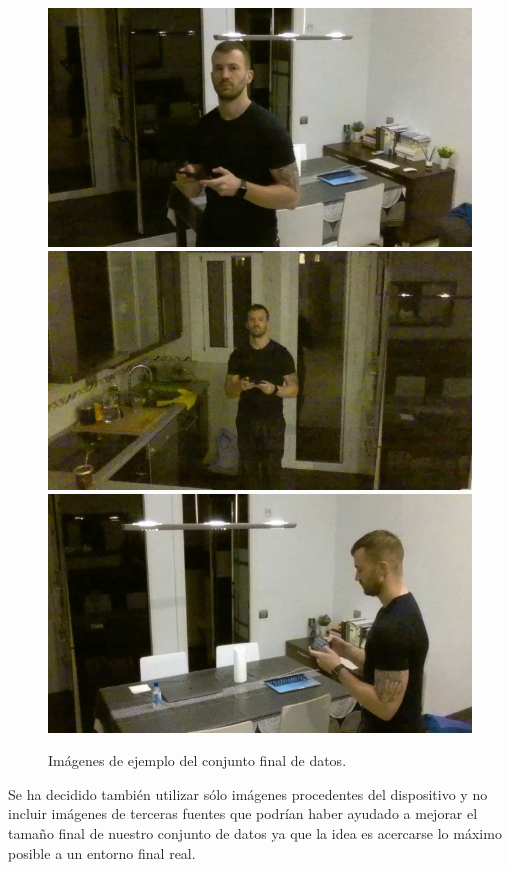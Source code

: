 \begin{figure}[H]
    \centering
    \includegraphics[scale=0.3]{figuras/dataset/image2.jpg}
    \includegraphics[scale=0.3]{figuras/dataset/image7.jpg}
    \includegraphics[scale=0.3]{figuras/dataset/image8.jpg}
    \caption[Imágenes de ejemplo del conjunto final de datos]{Imágenes de ejemplo del conjunto final de datos.}
    \label{fig-dataset-imagenes-ejemplo}
\end{figure}
\medskip
Se ha decidido también utilizar sólo imágenes procedentes del dispositivo y no incluir imágenes de terceras fuentes que podrían haber ayudado a mejorar el tamaño final de nuestro conjunto de datos ya que la idea es acercarse lo máximo posible a un entorno final real.
\medskip

